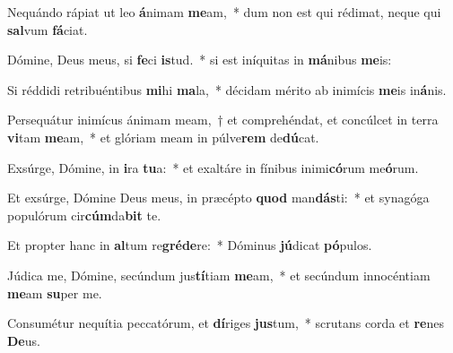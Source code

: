 \item Nequándo rápiat ut leo \textbf{á}nimam \textbf{me}am,~* dum non est qui rédimat, neque qui \textbf{sal}vum \textbf{fá}ciat.
\item Dómine, Deus meus, si \textbf{fe}ci \textbf{is}tud.~* si est iníquitas in \textbf{má}nibus \textbf{me}is:
\item Si réddidi retribuéntibus \textbf{mi}hi \textbf{ma}la,~* décidam mérito ab inimícis \textbf{me}is in\textbf{á}nis.
\item Persequátur inimícus ánimam meam,~† et comprehéndat, et concúlcet in terra \textbf{vi}tam \textbf{me}am,~* et glóriam meam in púlve\textbf{rem} de\textbf{dú}cat.
\item Exsúrge, Dómine, in \textbf{i}ra \textbf{tu}a:~* et exaltáre in fínibus inimi\textbf{có}rum me\textbf{ó}rum.
\item Et exsúrge, Dómine Deus meus, in præcépto \textbf{quod} man\textbf{dás}ti:~* et synagóga populórum cir\textbf{cúm}da\textbf{bit} te.
\item Et propter hanc in \textbf{al}tum re\textbf{gré}\textbf{de}re:~* Dóminus \textbf{jú}dicat \textbf{pó}pulos.
\item Júdica me, Dómine, secúndum jus\textbf{tí}tiam \textbf{me}am,~* et secúndum innocéntiam \textbf{me}am \textbf{su}per me.
\item Consumétur nequítia peccatórum, et \textbf{dí}riges \textbf{jus}tum,~* scrutans corda et \textbf{re}nes \textbf{De}us.
